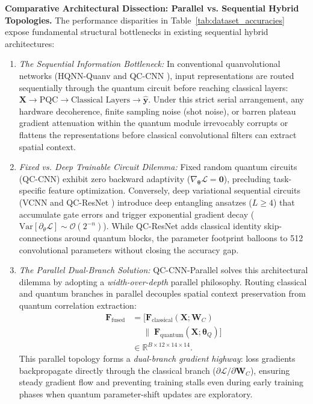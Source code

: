 \documentclass[pdflatex,sn-mathphys-num]{sn-jnl}%
\theoremstyle{thmstyleone}%
\theoremstyle{thmstyletwo}%
\theoremstyle{thmstylethree}%
\begin{document}
\textbf{Comparative Architectural Dissection: Parallel vs. Sequential Hybrid Topologies.} 
The performance disparities in Table~\ref{tab:dataset_accuracies} expose fundamental structural bottlenecks in existing sequential hybrid architectures:
\begin{enumerate}
    \item \textit{The Sequential Information Bottleneck:} In conventional quanvolutional networks (HQNN-Quanv \cite{senokosov2024quantum} and QC-CNN \cite{henderson2020quanvolutional}), input representations are routed sequentially through the quantum circuit before reaching classical layers: $\mathbf{X} \to \text{PQC} \to \text{Classical Layers} \to \hat{\mathbf{y}}$. Under this strict serial arrangement, any hardware decoherence, finite sampling noise (shot noise), or barren plateau gradient attenuation within the quantum module irrevocably corrupts or flattens the representations before classical convolutional filters can extract spatial context.
    \item \textit{Fixed vs. Deep Trainable Circuit Dilemma:} Fixed random quantum circuits (QC-CNN) exhibit zero backward adaptivity ($\nabla_{\boldsymbol{\theta}} \mathcal{L} = \mathbf{0}$), precluding task-specific feature optimization. Conversely, deep variational sequential circuits (VCNN and QC-ResNet \cite{kashif2024resqnets}) introduce deep entangling ansatzes ($L \ge 4$) that accumulate gate errors and trigger exponential gradient decay ($\mathrm{Var}[\partial_{\theta} \mathcal{L}] \sim \mathcal{O}(2^{-n})$). While QC-ResNet adds classical identity skip-connections around quantum blocks, the parameter footprint balloons to 512 convolutional parameters without closing the accuracy gap.
    \item \textit{The Parallel Dual-Branch Solution:} QC-CNN-Parallel solves this architectural dilemma by adopting a \textit{width-over-depth} parallel philosophy. Routing classical and quantum branches in parallel decouples spatial context preservation from quantum correlation extraction:
    \begin{align}
    \mathbf{F}_{\mathrm{fused}} &= \Big[ \mathbf{F}_{\mathrm{classical}}(\mathbf{X}; \mathbf{W}_C) \nonumber \\
    &\quad\; \|\; \mathbf{F}_{\mathrm{quantum}}(\mathbf{X}; \boldsymbol{\theta}_Q) \Big] \nonumber \\
    &\in \mathbb{R}^{B \times 12 \times 14 \times 14}.
    \label{eq:parallel_channel_fusion}
    \end{align}
    This parallel topology forms a \textit{dual-branch gradient highway}: loss gradients backpropagate directly through the classical branch ($\partial \mathcal{L} / \partial \mathbf{W}_C$), ensuring steady gradient flow and preventing training stalls even during early training phases when quantum parameter-shift updates are exploratory.
\end{enumerate}
\end{document}

